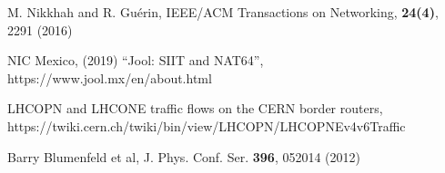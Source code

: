 \begin{thebibliography}{}




M. Nikkhah and R. Gu\'erin, 
IEEE/ACM Transactions on Networking, {\bf 24(4)}, 2291 (2016)

NIC Mexico, (2019) “Jool: SIIT and NAT64”,
https://www.jool.mx/en/about.html


LHCOPN and LHCONE traffic flows on the CERN border routers, 
https://twiki.cern.ch/twiki/bin/view/LHCOPN/LHCOPNEv4v6Traffic


Barry Blumenfeld et al, J. Phys. Conf. Ser. {\bf 396}, 052014 (2012)









\end{thebibliography}
